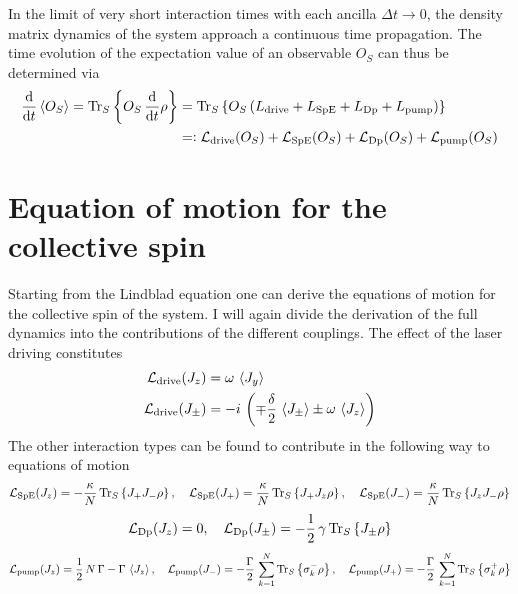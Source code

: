 In the limit of very short interaction times with each ancilla $\Delta t\rightarrow0$, the density matrix dynamics of the system approach a continuous time propagation. The time evolution of the expectation value of an observable $O_S$ can thus be determined via 
\begin{align}
    \frac{\text{d}}{\text{d}t} \braket{O_S}=\text{Tr}_S\left\{O_S\,\frac{\text{d}}{\text{d}t}\rho\right\}&=\text{Tr}_S\left\{O_S\,(L_\text{drive}+L_\text{SpE}+L_\text{Dp}+L_\text{pump})\right\}\notag\\
    &=\vcentcolon \mathcal{L}_\text{drive}(O_S)+\mathcal{L}_\text{SpE}(O_S)+\mathcal{L}_\text{Dp}(O_S)+\mathcal{L}_\text{pump}(O_S)
\end{align}

\section{Equation of motion for the collective spin}%
Starting from the Lindblad equation one can derive the equations of motion for the collective spin of the system. I will again divide the derivation of the full dynamics into the contributions of the different couplings. The effect of the laser driving constitutes 
\begin{align*}
    \mathcal{L}_\text{drive}(J_z)&=\omega\,\braket{J_y}\\
    \mathcal{L}_\text{drive}(J_\pm)&=-i\,\left(\mp\frac{\delta}{2}\, \braket{J_\pm} \pm \omega\, \braket{J_z}\right)
\end{align*}
The other interaction types can be found to contribute in the following way to equations of motion
\begin{align*}
    \mathcal{L}_\text{SpE}(J_z)=-\frac{\kappa}{N}\,\text{Tr}_S\left\{J_+ J_- \rho\right\},\quad
    \mathcal{L}_\text{SpE}(J_+)=\frac{\kappa}{N}\,\text{Tr}_S\left\{J_+ J_z \rho\right\},\quad
    \mathcal{L}_\text{SpE}(J_-)=\frac{\kappa}{N}\,\text{Tr}_S\left\{J_z J_- \rho\right\}
\end{align*}
\begin{align}
    \mathcal{L}_\text{Dp}(J_z)=0,\quad
    \mathcal{L}_\text{Dp}(J_\pm)=-\frac{1}{2}\,\gamma\,\text{Tr}_S\left\{J_\pm\rho\right\}
\end{align}
\begin{align*}
    \mathcal{L}_\text{pump}(J_z)=\frac{1}{2}\,N\,\Gamma-\Gamma\,\braket{J_z},\quad
    \mathcal{L}_\text{pump}(J_-)=-\frac{\Gamma}{2}\,\sum_{k=1}^N\text{Tr}_S\left\{\sigma_k^-\rho\right\},\quad
    \mathcal{L}_\text{pump}(J_+)=-\frac{\Gamma}{2}\,\sum_{k=1}^N\text{Tr}_S\left\{\sigma_k^+\rho\right\}
\end{align*}
